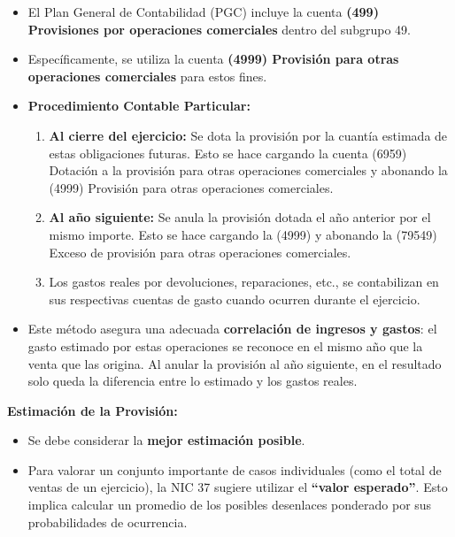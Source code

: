 \documentclass[
  paper=a4,
  ,captions=tableheading
]{scrbook}
\providecommand{\tightlist}{%
  \setlength{\itemsep}{0pt}\setlength{\parskip}{0pt}}
\begin{document}
\begin{itemize}
\tightlist
\item
  El Plan General de Contabilidad (PGC) incluye la cuenta \textbf{(499)
  Provisiones por operaciones comerciales} dentro del subgrupo 49.
\item
  Específicamente, se utiliza la cuenta \textbf{(4999) Provisión para
  otras operaciones comerciales} para estos fines.
\item
  \textbf{Procedimiento Contable Particular:}

  \begin{enumerate}
  \def\labelenumi{\arabic{enumi}.}
  \tightlist
  \item
    \textbf{Al cierre del ejercicio:} Se dota la provisión por la
    cuantía estimada de estas obligaciones futuras. Esto se hace
    cargando la cuenta (6959) Dotación a la provisión para otras
    operaciones comerciales y abonando la (4999) Provisión para otras
    operaciones comerciales.
  \item
    \textbf{Al año siguiente:} Se anula la provisión dotada el año
    anterior por el mismo importe. Esto se hace cargando la (4999) y
    abonando la (79549) Exceso de provisión para otras operaciones
    comerciales.
  \item
    Los gastos reales por devoluciones, reparaciones, etc., se
    contabilizan en sus respectivas cuentas de gasto cuando ocurren
    durante el ejercicio.
  \end{enumerate}
\item
  Este método asegura una adecuada \textbf{correlación de ingresos y
  gastos}: el gasto estimado por estas operaciones se reconoce en el
  mismo año que la venta que las origina. Al anular la provisión al año
  siguiente, en el resultado solo queda la diferencia entre lo estimado
  y los gastos reales.
\end{itemize}

\textbf{Estimación de la Provisión:}

\begin{itemize}
\tightlist
\item
  Se debe considerar la \textbf{mejor estimación posible}.
\item
  Para valorar un conjunto importante de casos individuales (como el
  total de ventas de un ejercicio), la NIC 37 sugiere utilizar el
  \textbf{``valor esperado''}. Esto implica calcular un promedio de los
  posibles desenlaces ponderado por sus probabilidades de ocurrencia.
\end{itemize}
\end{document}
